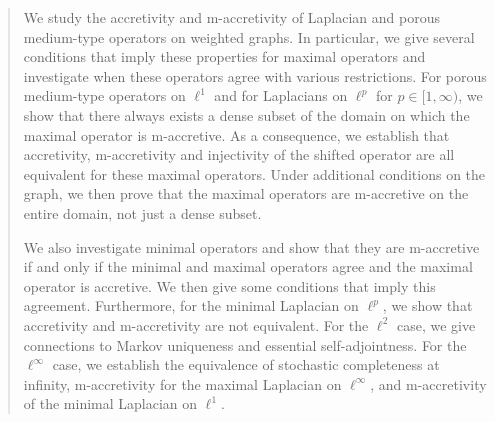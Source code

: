 \documentclass[letterpaper]{article}
\theoremstyle{definition}
\theoremstyle{named}
\numberwithin{equation}{section}
\begin{document}
\begin{abstract}
We study the accretivity and m-accretivity of Laplacian and porous medium-type operators on weighted graphs.
In particular, we give several conditions that imply these properties for
maximal operators and investigate when these operators agree with various restrictions. 
For porous medium-type operators
on $\ell^1$ and for Laplacians on $\ell^p$ for $p \in [1,\infty)$,
we show that there always exists a dense subset of the domain on which 
the maximal operator is m-accretive. 
As a consequence, we establish that
accretivity, m-accretivity and
injectivity of the shifted operator are all equivalent for these maximal operators.
Under additional conditions on the graph, we then prove that
the maximal operators are m-accretive on the entire domain,
not just a dense subset.

We also investigate minimal operators and show that they are m-accretive
if and only if the minimal and maximal operators agree and the maximal operator
is accretive. We then give some conditions
that imply this agreement.
Furthermore, for the minimal Laplacian on $\ell^p$, we show that accretivity
and m-accretivity are not equivalent. For the $\ell^2$ case, we give connections
to Markov uniqueness and essential self-adjointness.
For the $\ell^\infty$ case, we establish the equivalence of stochastic completeness at infinity, 
m-accretivity for the maximal Laplacian on $\ell^\infty$,
and m-accretivity of the minimal Laplacian on $\ell^1$.
\end{abstract}
\end{document}
